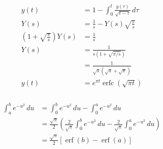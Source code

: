 \documentclass{article}
\DeclareMathOperator{\erf}{erf}
\DeclareMathOperator{\erfc}{erfc}
\begin{document}
\begin{align*}
  y(t)                                         & = 1 - \int_0^t \frac{y(\tau)}{\sqrt{t - \tau}} \,d \tau \\
  Y(s)                                         & = \frac{1}{s} - Y(s) \sqrt{\frac{\pi}{s}}               \\
  \left( 1 + \sqrt{\frac{\pi}{s}} \right) Y(s) & = \frac{1}{s}                                           \\
  Y(s)                                         & = \frac{1}{s (1 + \sqrt{\pi / s})}                      \\
                                               & = \frac{1}{\sqrt{s} (\sqrt{s} + \sqrt{\pi})}            \\
  y(t)                                         & = e^{\pi t} \erfc(\sqrt{\pi t})
\end{align*}

\setcounter{subsubsection}{10}
\subsubsection{}

\begin{align*}
  \int_a^b e^{-u^2} \,d u & = \int_0^b e^{-u^2} \,du - \int_0^a e^{-u^2} \,d u                                                                                \\
                          & = \frac{\sqrt{\pi}}{2} \left( \frac{2}{\sqrt{\pi}} \int_0^b e^{-u^2} \,d u - \frac{2}{\sqrt{\pi}} \int_0^a e^{-u^2} \,d u \right) \\
                          & = \frac{\sqrt{\pi}}{2} [\erf(b) - \erf(a)]
\end{align*}
\end{document}
